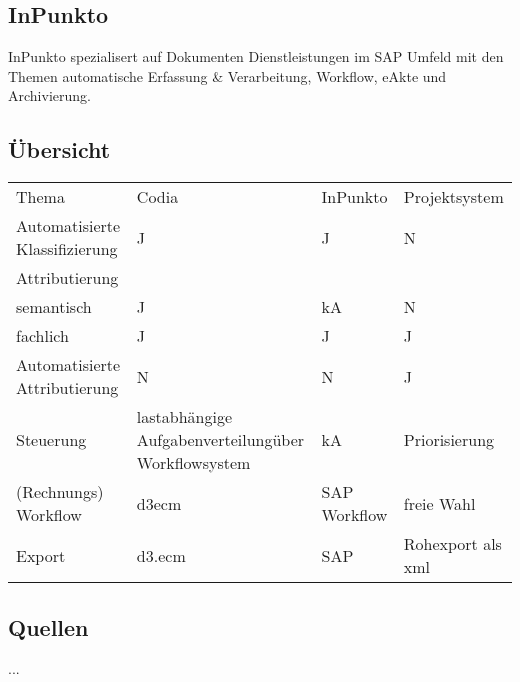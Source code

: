 \documentclass[11pt,oneside,a4paper,notitlepage]{article}
\newcommand{\brand}{Projektsystem }
\begin{document}
\subsection{InPunkto}
InPunkto spezialisert auf Dokumenten Dienstleistungen im SAP Umfeld mit den Themen automatische Erfassung \& Verarbeitung, Workflow, 
eAkte und Archivierung.


\subsection{Übersicht}
%

\begin{center}
\begin{tabulary}{\textwidth}{LLLL}
Thema & Codia & InPunkto & \brand \\
Automatisierte Klassifizierung & J & J & N \\
Attributierung & & & \\
semantisch & J & kA & N\\
fachlich & J & J & J \\
Automatisierte Attributierung & N & N & J \\
Steuerung & lastabhängige Aufgabenverteilung\newline über Workflowsystem & kA & Priorisierung\\
(Rechnungs) Workflow & d3ecm & SAP Workflow & freie Wahl \\
Export & d3.ecm & SAP & Rohexport als xml\\
\end{tabulary}
\end{center}



\subsection{Quellen}


\label{q:1} ...

%
\end{document}
